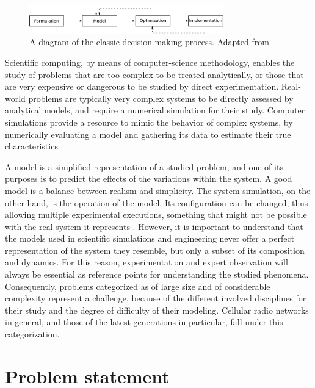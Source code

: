 \begin{figure}
\centering

\includegraphics[width=0.75\textwidth]{01-introduction/img/decision_making_process}

\caption{A diagram of the classic decision-making process. Adapted from \cite{Talbi_Metaheuristics:2009}.\label{fig:01-decision_making_process}}
\end{figure}


\bigskip{}


Scientific computing, by means of computer-science methodology, enables
the study of problems that are too complex to be treated analytically,
or those that are very expensive or dangerous to be studied by direct
experimentation. Real-world problems are typically very complex systems
to be directly assessed by analytical models, and require a numerical
simulation for their study. Computer simulations provide a resource
to mimic the behavior of complex systems, by numerically evaluating
a model and gathering its data to estimate their true characteristics
\cite{law2007simulation}.

A model is a simplified representation of a studied problem, and one
of its purposes is to predict the effects of the variations within
the system. A good model is a balance between realism and simplicity.
The system simulation, on the other hand, is the operation of the
model. Its configuration can be changed, thus allowing multiple experimental
executions, something that might not be possible with the real system
it represents \cite{maria1997introduction}. However, it is important
to understand that the models used in scientific simulations and engineering
never offer a perfect representation of the system they resemble,
but only a subset of its composition and dynamics. For this reason,
experimentation and expert observation will always be essential as
reference points for understanding the studied phenomena. Consequently,
problems categorized as of large size and of considerable complexity
represent a challenge, because of the different involved disciplines
for their study and the degree of difficulty of their modeling. Cellular
radio networks in general, and those of the latest generations in
particular, fall under this categorization.


\section{Problem statement}

